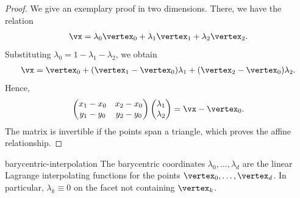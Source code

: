 \begin{proof}
  We give an exemplary proof in two dimensions. There, we have the relation
  \begin{gather}
    \vx = \lambda_0 \vertex_0 + \lambda_1 \vertex_1 + \lambda_2 \vertex_2.
  \end{gather}
  Substituting $\lambda_0 = 1-\lambda_1 - \lambda_2$, we obtain
  \begin{gather}
    \vx = \vertex_0 + (\vertex_1-\vertex_0)\lambda_1 + (\vertex_2-\vertex_0)\lambda_2.
  \end{gather}
  Hence,
  \begin{gather}
    \begin{pmatrix}
      x_1-x_0 & x_2-x_0\\
      y_1-y_0 & y_2-y_0
    \end{pmatrix}
    \begin{pmatrix}
      \lambda_1\\ \lambda_2
    \end{pmatrix}
    =
    \vx - \vertex_0.
  \end{gather}
  The matrix is invertible if the points span a triangle,
  which proves the affine relationship.
\end{proof}

\begin{Corollary}{barycentric-interpolation}
  The barycentric coordinates $\lambda_0,\dots,\lambda_d$ are the
  linear Lagrange interpolating functions for the points
  $\vertex_0,\dots,\vertex_d$. In particular, $\lambda_k \equiv 0$ on
  the facet not containing $\vertex_k$.
\end{Corollary}

